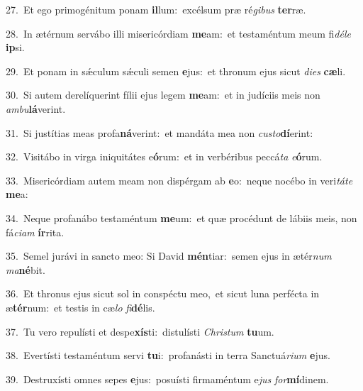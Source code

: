 {\numbfont\textcolor{\numbcolor}{27.}}~Et ego primogénitum ponam \textbf{il}\-lum:~\star excélsum præ ré\-\textit{gi}\-\textit{bus} \textbf{ter}\-ræ.\par
{\numbfont\textcolor{\numbcolor}{28.}}~In ætérnum servábo illi misericórdiam \textbf{me}\-am:~\star et testaméntum meum fi\-\textit{dé}\-\textit{le} \textbf{ip}\-si.\par
{\numbfont\textcolor{\numbcolor}{29.}}~Et ponam in sǽculum sǽculi semen \textbf{e}\-jus:~\star et thronum ejus sicut \textit{di}\-\textit{es} \textbf{cæ}\-li.\par
{\numbfont\textcolor{\numbcolor}{30.}}~Si autem derelíquerint fílii ejus legem \textbf{me}\-am:~\star et in judíciis meis non \textit{am}\-\textit{bu}\textbf{lá}verint.\par
{\numbfont\textcolor{\numbcolor}{31.}}~Si justítias meas profa\-\textbf{ná}\-verint:~\star et mandáta mea non \textit{cus}\-\textit{to}\textbf{dí}erint:\par
{\numbfont\textcolor{\numbcolor}{32.}}~Visitábo in virga iniquitátes e\-\textbf{ó}\-rum:~\star et in verbéribus peccá\textit{ta} \textit{e}\-\textbf{ó}rum.\par
{\numbfont\textcolor{\numbcolor}{33.}}~Misericórdiam autem meam non dispérgam ab \textbf{e}\-o:~\star neque nocébo in veri\-\textit{tá}\-\textit{te} \textbf{me}\-a:\par
{\numbfont\textcolor{\numbcolor}{34.}}~Neque profanábo testaméntum \textbf{me}\-um:~\star et quæ procédunt de lábiis meis, non fá\-\textit{ci}\-\textit{am} \textbf{ír}\-rita.\par
{\numbfont\textcolor{\numbcolor}{35.}}~Semel jurávi in sancto meo: Si David \textbf{mén}\-tiar:~\star semen ejus in ætér\textit{num} \textit{ma}\-\textbf{né}bit.\par
{\numbfont\textcolor{\numbcolor}{36.}}~Et thronus ejus sicut sol in conspéctu meo,~\dagger et sicut luna perfécta in æ\-\textbf{tér}\-num:~\star et testis in cæ\textit{lo} \textit{fi}\-\textbf{dé}lis.\par
{\numbfont\textcolor{\numbcolor}{37.}}~Tu vero repulísti et despe\-\textbf{xís}\-ti:~\star distulísti \textit{Chris}\-\textit{tum} \textbf{tu}\-um.\par
{\numbfont\textcolor{\numbcolor}{38.}}~Evertísti testaméntum servi \textbf{tu}\-i:~\star profanásti in terra Sanctuá\-\textit{ri}\-\textit{um} \textbf{e}\-jus.\par
{\numbfont\textcolor{\numbcolor}{39.}}~Destruxísti omnes sepes \textbf{e}\-jus:~\star posuísti firmaméntum e\textit{jus} \textit{for}\-\textbf{mí}dinem.\par
